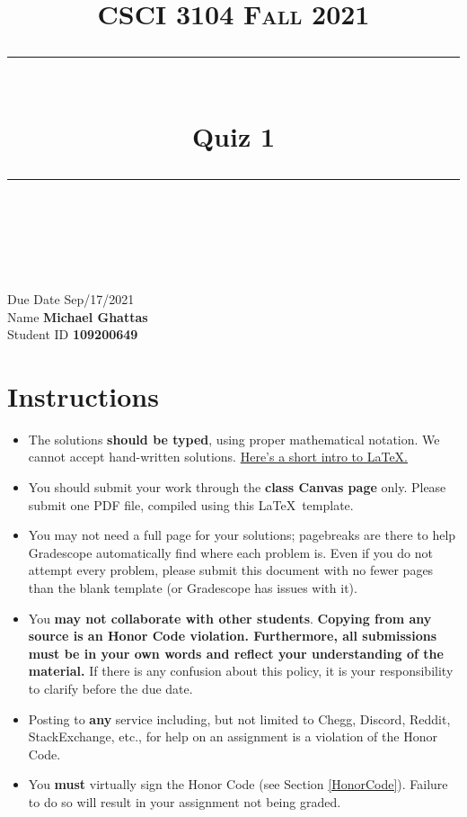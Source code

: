 \documentclass[11pt]{article}
\title{
\normalfont \normalsize 
\textsc{CSCI 3104 Fall 2021} \\
[10pt] 
\rule{\linewidth}{0.5pt} \\[6pt] 
\huge Quiz 1 \\
\rule{\linewidth}{2pt}  \\[10pt]
}
\date{}
\theoremstyle{definition}
\theoremstyle{definition}
\theoremstyle{definition}
\begin{document}
\maketitle


\noindent
Due Date \dotfill Sep/17/2021\\
Name \dotfill \textbf{Michael Ghattas} \\
Student ID \dotfill \textbf{109200649} \\


\tableofcontents

\section{Instructions}
 \begin{itemize}
	\item The solutions \textbf{should be typed}, using proper mathematical notation. We cannot accept hand-written solutions. \href{http://ece.uprm.edu/~caceros/latex/introduction.pdf}{Here's a short intro to \LaTeX.}
	\item You should submit your work through the \textbf{class Canvas page} only. Please submit one PDF file, compiled using this \LaTeX \ template.
	\item You may not need a full page for your solutions; pagebreaks are there to help Gradescope automatically find where each problem is. Even if you do not attempt every problem, please submit this document with no fewer pages than the blank template (or Gradescope has issues with it).

	\item You \textbf{may not collaborate with other students}. \textbf{Copying from any source is an Honor Code violation. Furthermore, all submissions must be in your own words and reflect your understanding of the material.} If there is any confusion about this policy, it is your responsibility to clarify before the due date. 

	\item Posting to \textbf{any} service including, but not limited to Chegg, Discord, Reddit, StackExchange, etc., for help on an assignment is a violation of the Honor Code.

	\item You \textbf{must} virtually sign the Honor Code (see Section \ref{HonorCode}). Failure to do so will result in your assignment not being graded.
\end{itemize}
\end{document}
